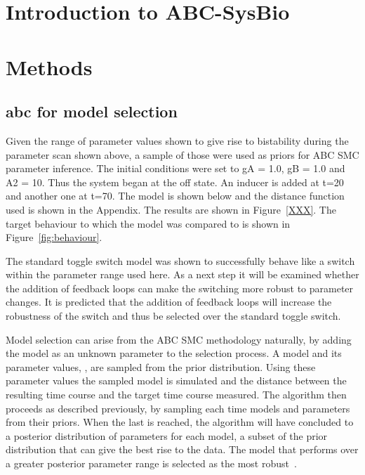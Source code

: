 \section{Introduction to ABC-SysBio}







\section{Methods}



\subsection{\acrshort{abc} for model selection}
Given the range of parameter values shown to give rise to bistability during the parameter scan shown above, a sample of those were used as priors for ABC SMC parameter inference. The initial conditions were set to gA = 1.0, gB = 1.0 and A2 = 10. Thus the system began at the off state. An inducer is added at t=20 and another one at t=70. The model is shown below and the distance function used is shown in the Appendix. The results are shown in Figure~\ref{XXX}. The target behaviour to which the model was compared to is shown in Figure~\ref{fig:behaviour}.

The standard toggle switch model was shown to successfully behave like a switch within the parameter range used here. As a next step it will be examined whether the addition of feedback loops can make the switching more robust to parameter changes. It is predicted that the addition of feedback loops will increase the robustness of the switch and thus be selected over the standard toggle switch.

Model selection can arise from the ABC SMC methodology naturally, by adding the model as an unknown parameter to the selection process. A model and its parameter values, \texttheta, are sampled from the prior distribution. Using these parameter values the sampled model is simulated and the distance between the resulting time course and the target time course measured. The algorithm then proceeds as described previously, by sampling each time models and parameters from their priors. When the last \textepsilon{} is reached, the algorithm will have concluded to a posterior distribution of parameters for each model, a subset of the prior distribution that can give the best rise to the data. The model that performs over a greater posterior parameter range is selected as the most robust~\autocite{Toni:2009tr}.  
    

